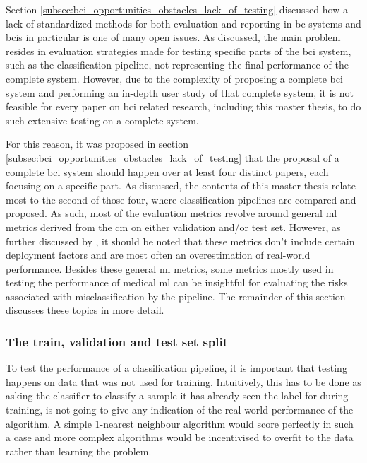Section \ref{subsec:bci_opportunities_obstacles_lack_of_testing} discussed how a lack of standardized methods for both evaluation and reporting in \gls{bc} systems and \glspl{bci} in particular is one of many open issues.
As discussed, the main problem resides in evaluation strategies made for testing specific parts of the \gls{bci} system, such as the classification pipeline, not representing the final performance of the complete system.
However, due to the complexity of proposing a complete \gls{bci} system and performing an in-depth user study of that complete system, it is not feasible for every paper on \gls{bci} related research, including this master thesis, to do such extensive testing on a complete system.

For this reason, it was proposed in section \ref{subsec:bci_opportunities_obstacles_lack_of_testing} that the proposal of a complete \gls{bci} system should happen over at least four distinct papers, each focusing on a specific part.
As discussed, the contents of this master thesis relate most to the second of those four, where classification pipelines are compared and proposed.
As such, most of the evaluation metrics revolve around general \gls{ml} metrics derived from the \gls{cm} on either validation and/or test set.
However, as further discussed by \citet{ml_underspec}, it should be noted that these metrics don't include certain deployment factors and are most often an overestimation of real-world performance.
Besides these general \gls{ml} metrics, some metrics mostly used in testing the performance of medical \gls{ml} can be insightful for evaluating the risks associated with misclassification by the pipeline.
The remainder of this section discusses these topics in more detail.


\subsubsection{The train, validation and test set split}
\label{subsubsec:processing_signals_evaluating_and_using_evaluation_valtest}

To test the performance of a classification pipeline, it is important that testing happens on data that was not used for training.
Intuitively, this has to be done as asking the classifier to classify a sample it has already seen the label for during training, is not going to give any indication of the real-world performance of the algorithm.
A simple 1-nearest neighbour algorithm would score perfectly in such a case and more complex algorithms would be incentivised to overfit to the data rather than learning the problem.

